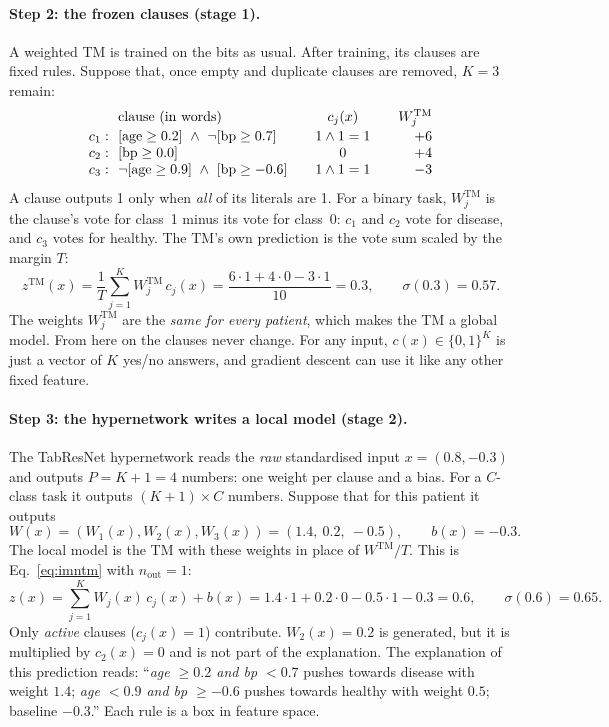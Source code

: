 \paragraph{Step 2: the frozen clauses (stage 1).} A weighted TM is trained on the bits as usual. After
training, its clauses are fixed rules. Suppose that, once empty and duplicate clauses are removed,
$K=3$ remain:
\[
\begin{array}{l@{\ \ }l@{\qquad}c@{\qquad}r}
  & \text{clause (in words)} & c_j(x) & W^\text{TM}_j\\[2pt]
  c_1: & [\text{age}\ge0.2]\ \land\ \lnot[\text{bp}\ge0.7] & 1\land1=1 & +6\\
  c_2: & [\text{bp}\ge0.0]                               & 0          & +4\\
  c_3: & \lnot[\text{age}\ge0.9]\ \land\ [\text{bp}\ge-0.6] & 1\land1=1 & -3
\end{array}
\]
A clause outputs 1 only when \emph{all} of its literals are 1. For a binary task, $W^\text{TM}_j$ is the
clause's vote for class~1 minus its vote for class~0: $c_1$ and $c_2$ vote for disease, and $c_3$ votes
for healthy. The TM's own prediction is the vote sum scaled by the margin $T$:
\[
  z^\text{TM}(x)=\frac{1}{T}\sum_{j=1}^{K}W^\text{TM}_j\,c_j(x)=\frac{6\cdot1+4\cdot0-3\cdot1}{10}=0.3,
  \qquad \sigma(0.3)=0.57 .
\]
The weights $W^\text{TM}_j$ are the \emph{same for every patient}, which makes the TM a global model. From
here on the clauses never change. For any input, $c(x)\in\{0,1\}^K$ is just a vector of $K$ yes/no
answers, and gradient descent can use it like any other fixed feature.

\paragraph{Step 3: the hypernetwork writes a local model (stage 2).} The TabResNet hypernetwork reads the
\emph{raw} standardised input $x=(0.8,-0.3)$ and outputs $P=K+1=4$ numbers: one weight per clause and a
bias. For a $C$-class task it outputs $(K{+}1)\times C$ numbers. Suppose that for this patient it
outputs
\[
  W(x)=(W_1(x),W_2(x),W_3(x))=(1.4,\ 0.2,\ -0.5),\qquad b(x)=-0.3 .
\]
The local model is the TM with these weights in place of $W^\text{TM}/T$. This is Eq.~\eqref{eq:imntm} with
$n_\text{out}=1$:
\[
  z(x)=\sum_{j=1}^{K}W_j(x)\,c_j(x)+b(x)=1.4\cdot1+0.2\cdot0-0.5\cdot1-0.3=0.6,\qquad \sigma(0.6)=0.65 .
\]
Only \emph{active} clauses ($c_j(x)=1$) contribute. $W_2(x)=0.2$ is generated, but it is multiplied by
$c_2(x)=0$ and is not part of the explanation. The explanation of this prediction reads: ``\emph{age
$\ge0.2$ and bp $<0.7$} pushes towards disease with weight $1.4$; \emph{age $<0.9$ and bp $\ge-0.6$}
pushes towards healthy with weight $0.5$; baseline $-0.3$.'' Each rule is a box in feature space.

